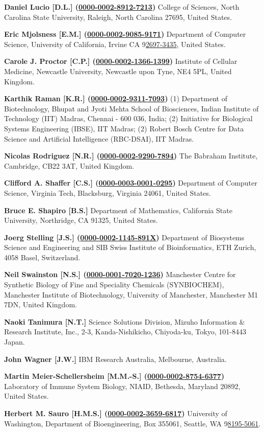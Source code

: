 \documentclass{sbml-paper}
\newcommand{\orcid}[1]{\href{https://orcid.org/#1}{#1}}
\begin{document}
\textbf{Daniel Lucio [D.L.] (\orcid{0000-0002-8912-7213})} College of Sciences, North Carolina State University, Raleigh, North Carolina 27695, United States.

\textbf{Eric Mjolsness [E.M.] (\orcid{0000-0002-9085-9171})} Department of Computer Science, University of California, Irvine CA 9\orcid{2697-3435}, United States.

\textbf{Carole J. Proctor [C.P.] (\orcid{0000-0002-1366-1399})} Institute of Cellular Medicine, Newcastle University, Newcastle upon Tyne, NE4 5PL, United Kingdom.

\textbf{Karthik Raman [K.R.] (\orcid{0000-0002-9311-7093})} (1) Department of Biotechnology, Bhupat and Jyoti Mehta School of Biosciences, Indian Institute of Technology (IIT) Madras, Chennai - 600 036, India; (2) Initiative for Biological Systems Engineering (IBSE), IIT Madras; (2) Robert Bosch Centre for Data Science and Artificial Intelligence (RBC-DSAI), IIT Madras.

\textbf{Nicolas Rodriguez [N.R.] (\orcid{0000-0002-9290-7894})} The Babraham Institute, Cambridge, CB22 3AT, United Kingdom.

\textbf{Clifford A. Shaffer [C.S.] (\orcid{0000-0003-0001-0295})} Department of Computer Science, Virginia Tech, Blacksburg, Virginia 24061, United States.

\textbf{Bruce E. Shapiro [B.S.]} Department of Mathematics, California State University, Northridge, CA 91325, United States.

\textbf{Joerg Stelling [J.S.] (\orcid{0000-0002-1145-891X})} Department of Biosystems Science and Engineering and SIB Swiss Institute of Bioinformatics, ETH Zurich, 4058 Basel, Switzerland.

\textbf{Neil Swainston [N.S.] (\orcid{0000-0001-7020-1236})} Manchester Centre for Synthetic Biology of Fine and Speciality Chemicals (SYNBIOCHEM), Manchester Institute of Biotechnology, University of Manchester, Manchester M1 7DN, United Kingdom.

\textbf{Naoki Tanimura [N.T.]} Science Solutions Division, Mizuho Information \& Research Institute, Inc., 2-3, Kanda-Nishikicho, Chiyoda-ku, Tokyo, 101-8443 Japan.

\textbf{John Wagner [J.W.]} IBM Research Australia, Melbourne, Australia.

\textbf{Martin Meier-Schellersheim [M.M.-S.] (\orcid{0000-0002-8754-6377})} Laboratory of Immune System Biology, NIAID, Bethesda, Maryland 20892, United States.

\textbf{Herbert M. Sauro [H.M.S.] (\orcid{0000-0002-3659-6817})} University of Washington, Department of Bioengineering, Box 355061, Seattle, WA 9\orcid{8195-5061}.
\end{document}
